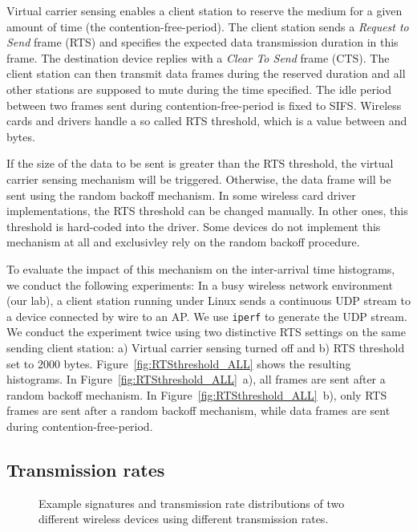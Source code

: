 \documentclass[10pt, conference, compsocconf, letterpaper]{IEEEtran}
\begin{document}
Virtual carrier sensing enables a client station to reserve the medium for a given amount of time (the contention-free-period).
The client station sends a {\em Request to Send} frame (RTS) and specifies the expected data transmission duration in this frame.
The destination device replies with a {\em Clear To Send} frame (CTS).
The client station can then transmit data frames during the reserved duration and all other stations are supposed to mute during the time specified. 
The idle period between two frames sent during contention-free-period is fixed to SIFS.
Wireless cards and drivers handle a so called RTS threshold, which is a value between  and  bytes.

If the size of the data to be sent is greater than the RTS threshold, the virtual carrier sensing mechanism will be triggered.
Otherwise, the data frame will be sent using the random backoff mechanism.
In some wireless card driver implementations, the RTS threshold can be changed manually. 
In other ones, this threshold is hard-coded into the driver. 
Some devices do not implement this mechanism at all and exclusivley rely on the random backoff procedure.

To evaluate the impact of this mechanism on the inter-arrival time histograms, we conduct the following experiments: 
In a busy wireless network environment (our lab), a client station running under Linux sends a continuous UDP stream to a device connected by wire to an AP.
We use {\tt iperf} to generate the UDP stream.
We conduct the experiment twice using two distinctive RTS settings on the same sending client station:  
a) Virtual carrier sensing turned off and b) RTS threshold set to 2000 bytes.
Figure~\ref{fig:RTSthreshold_ALL} shows the resulting histograms. 
In Figure~\ref{fig:RTSthreshold_ALL}~a), all frames are sent after a random backoff mechanism.
In Figure~\ref{fig:RTSthreshold_ALL}~b), only RTS frames are sent after a random backoff mechanism, while data frames are sent during contention-free-period.





\subsection{Transmission rates}
\label{sec:transmissionrates}


\begin{figure}
\begin{center}
\hfil
{}
\caption{Example signatures and transmission rate distributions of two different wireless devices using different transmission rates.}
\label{fig:transmissionrates}
\end{center}
\end{figure}
\end{document}
